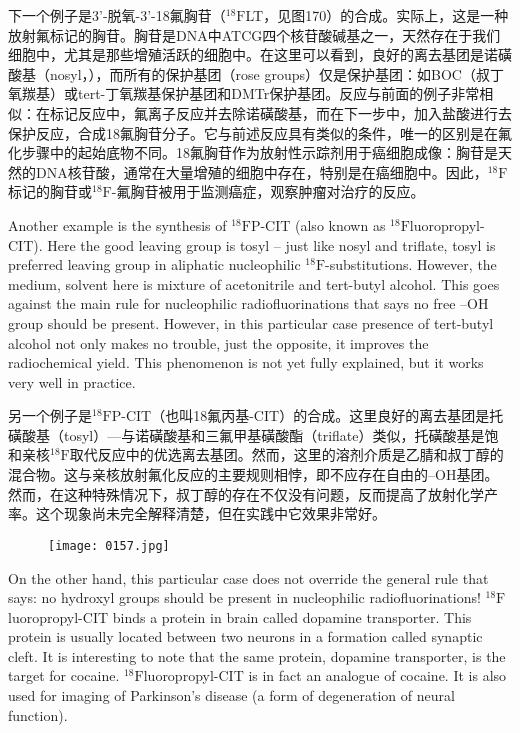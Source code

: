 \documentclass[dvipsnames, svgnames,a4paper,11pt]{article}
\begin{document}
下一个例子是3’-脱氧-3’-18氟胸苷（${}^\mathrm{18}\mathrm{F}$LT，见图170）的合成。实际上，这是一种放射氟标记的胸苷。胸苷是DNA中ATCG四个核苷酸碱基之一，天然存在于我们细胞中，尤其是那些增殖活跃的细胞中。在这里可以看到，良好的离去基团是诺磺酸基（nosyl，），而所有的保护基团（rose groups）仅是保护基团：如BOC（叔丁氧羰基）或tert-丁氧羰基保护基团和DMTr保护基团。反应与前面的例子非常相似：在标记反应中，氟离子反应并去除诺磺酸基，而在下一步中，加入盐酸进行去保护反应，合成18氟胸苷分子。它与前述反应具有类似的条件，唯一的区别是在氟化步骤中的起始底物不同。18氟胸苷作为放射性示踪剂用于癌细胞成像：胸苷是天然的DNA核苷酸，通常在大量增殖的细胞中存在，特别是在癌细胞中。因此，${}^\mathrm{18}\mathrm{F}$标记的胸苷或${}^\mathrm{18}\mathrm{F}$-氟胸苷被用于监测癌症，观察肿瘤对治疗的反应。


Another example is the synthesis of ${}^\mathrm{18}\mathrm{F}$P-CIT (also known as ${}^\mathrm{18}\mathrm{F}$luoropropyl-CIT).
Here the good leaving group is tosyl – just like nosyl and triflate, tosyl is preferred
leaving group in aliphatic nucleophilic ${}^\mathrm{18}\mathrm{F}$-substitutions. However, the medium,
solvent here is mixture of acetonitrile and tert-butyl alcohol. This goes against the
main rule for nucleophilic radiofluorinations that says no free –OH group should be
present. However, in this particular case presence of tert-butyl alcohol not only
makes no trouble, just the opposite, it improves the radiochemical yield. This
phenomenon is not yet fully explained, but it works very well in practice.

另一个例子是${}^\mathrm{18}\mathrm{F}$P-CIT（也叫18氟丙基-CIT）的合成。这里良好的离去基团是托磺酸基（tosyl）—与诺磺酸基和三氟甲基磺酸酯（triflate）类似，托磺酸基是饱和亲核${}^\mathrm{18}\mathrm{F}$取代反应中的优选离去基团。然而，这里的溶剂介质是乙腈和叔丁醇的混合物。这与亲核放射氟化反应的主要规则相悖，即不应存在自由的–OH基团。然而，在这种特殊情况下，叔丁醇的存在不仅没有问题，反而提高了放射化学产率。这个现象尚未完全解释清楚，但在实践中它效果非常好。

\begin{figure}[h]
	\centering
    \texttt{[image: 0157.jpg]}    
     \label{fig171}
\end{figure}

On the other hand, this particular case does not override the general rule that says:
no hydroxyl groups should be present in nucleophilic radiofluorinations!
${}^\mathrm{18}\mathrm{F}$luoropropyl-CIT binds a protein in brain called dopamine transporter. This protein
is usually located between two neurons in a formation called synaptic cleft. It is
interesting to note that the same protein, dopamine transporter, is the target for
cocaine. ${}^\mathrm{18}\mathrm{F}$luoropropyl-CIT is in fact an analogue of cocaine. It is also used for
imaging of Parkinson’s disease (a form of degeneration of neural function).
\end{document}
